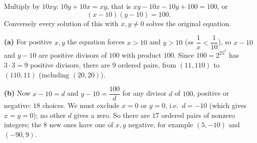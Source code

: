 Multiply by $10xy$: $10y+10x=xy$, that is $xy-10x-10y+100=100$, or
\[
(x-10)(y-10)=100 .
\]
Conversely every solution of this with $x,y\ne0$ solves the original equation.

\textbf{(a)} For positive $x,y$ the equation forces $x>10$ and $y>10$ (as $\dfrac{1}{x}<\dfrac{1}{10}$), so $x-10$ and $y-10$ are positive divisors of $100$ with product $100$. Since $100=2^25^2$ has $3\cdot3=9$ positive divisors, there are $\boxed{9}$ ordered pairs, from $(11,110)$ to $(110,11)$ (including $(20,20)$).

\textbf{(b)} Now $x-10=d$ and $y-10=\dfrac{100}{d}$ for any divisor $d$ of $100$, positive or negative: $18$ choices. We must exclude $x=0$ or $y=0$, i.e.\ $d=-10$ (which gives $x=y=0$); no other $d$ gives a zero. So there are $\boxed{17}$ ordered pairs of nonzero integers; the $8$ new ones have one of $x,y$ negative, for example $(5,-10)$ and $(-90,9)$.
